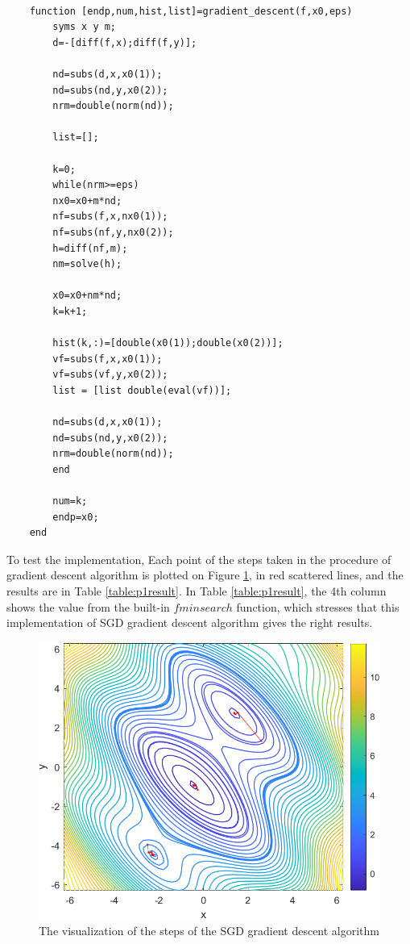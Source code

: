 \documentclass[12pt]{article}
\begin{document}
\begin{lstlisting}[style=MatlabStyle,caption=SGD Gradient Descent,label=code:sgd]

	function [endp,num,hist,list]=gradient_descent(f,x0,eps)
		syms x y m;
		d=-[diff(f,x);diff(f,y)];
		
		nd=subs(d,x,x0(1));
		nd=subs(nd,y,x0(2));
		nrm=double(norm(nd));
		
		list=[];
		
		k=0;
		while(nrm>=eps)
		nx0=x0+m*nd;
		nf=subs(f,x,nx0(1));
		nf=subs(nf,y,nx0(2));
		h=diff(nf,m);
		nm=solve(h);
		
		x0=x0+nm*nd;
		k=k+1;
		
		hist(k,:)=[double(x0(1));double(x0(2))];
		vf=subs(f,x,x0(1));
		vf=subs(vf,y,x0(2));
		list = [list double(eval(vf))];
		
		nd=subs(d,x,x0(1));
		nd=subs(nd,y,x0(2)); 
		nrm=double(norm(nd));
		end
		
		num=k;
		endp=x0;
	end
\end{lstlisting}

To test the implementation, Each point of the steps taken in the procedure of gradient descent algorithm is plotted on Figure \ref{fig:p1_visualize}, in red scattered lines, and the results are in Table \ref{table:p1result}. In Table \ref{table:p1result}, the 4th column shows the value from the built-in $fminsearch$ function, which stresses that this implementation of SGD gradient descent algorithm gives the right results.

\begin{figure}[h]
	\caption{The visualization of the steps of the SGD gradient descent algorithm}
	\centering
	\includegraphics{p1_visualize_in_contour.png}
	
	\label{fig:p1_visualize}
\end{figure}
\end{document}
